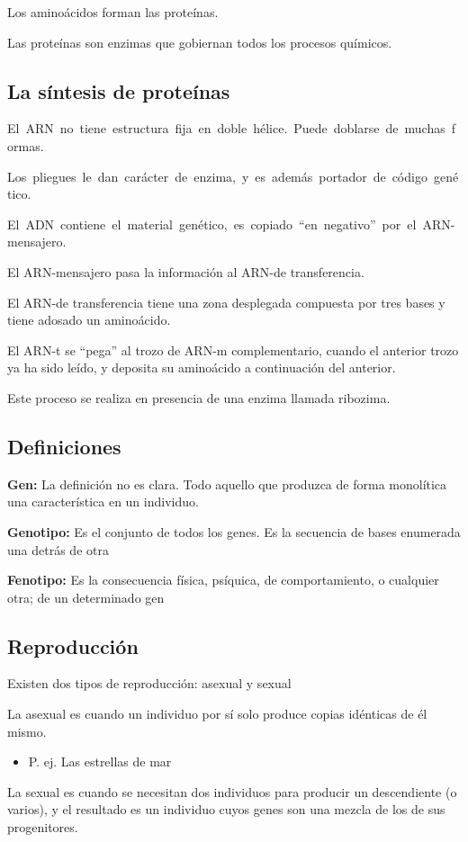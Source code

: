 \documentclass[12pt, twoside, openright]{report} %
\begin{document}
Los aminoácidos forman las proteínas.

Las proteínas son enzimas que gobiernan todos los procesos químicos.

\subsection{La síntesis de proteínas}
El ARN no tiene estructura fija en doble hélice. Puede doblarse de muchas formas.

Los pliegues le dan carácter de enzima, y es además portador de código genético.

El ADN contiene el material genético, es copiado “en negativo” por el ARN-mensajero.

El ARN-mensajero pasa la información al ARN-de transferencia.

El ARN-de transferencia tiene una zona desplegada compuesta por tres bases y tiene adosado un aminoácido.

El ARN-t se “pega” al trozo de ARN-m complementario, cuando el anterior trozo ya ha sido leído, y deposita su aminoácido a continuación del anterior.

Este proceso se realiza en presencia de una enzima llamada ribozima.

\subsection{Definiciones}
\textbf{Gen:} La definición no es clara. Todo aquello que produzca de forma monolítica una característica en un individuo.

\textbf{Genotipo:} Es el conjunto de todos los genes. Es la secuencia de bases enumerada una detrás de otra

\textbf{Fenotipo:} Es la consecuencia física, psíquica, de comportamiento, o cualquier otra; de un determinado gen

\subsection{Reproducción}
Existen dos tipos de reproducción: asexual y sexual

La asexual es cuando un individuo por sí solo produce copias idénticas de él mismo.
\begin{itemize}
	\item P. ej. Las estrellas de mar
\end{itemize}

La sexual es cuando se necesitan dos individuos para producir un descendiente (o varios), y el resultado es un individuo cuyos genes son una mezcla de los de sus progenitores.
\end{document}
